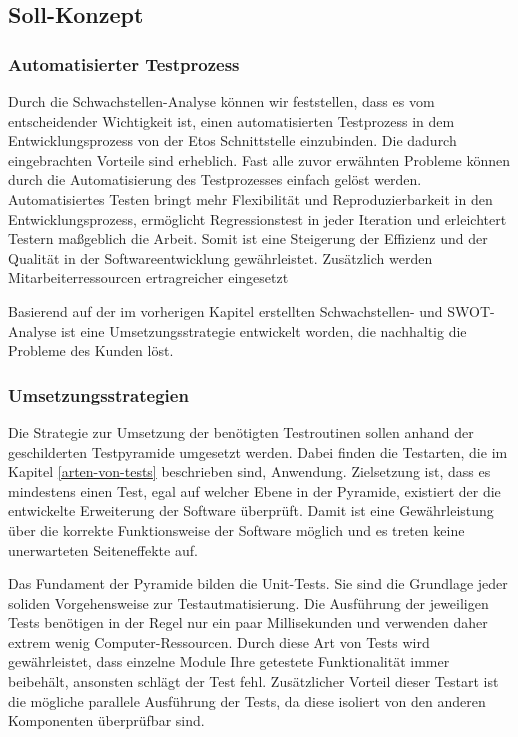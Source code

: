 \subsection{Soll-Konzept}
\subsubsection{Automatisierter Testprozess}
Durch die Schwachstellen-Analyse können wir feststellen, dass es vom entscheidender Wichtigkeit ist, einen automatisierten Testprozess in dem Entwicklungsprozess von der Etos Schnittstelle einzubinden. Die dadurch eingebrachten Vorteile sind erheblich. Fast alle zuvor erwähnten Probleme können durch die Automatisierung des Testprozesses einfach gelöst werden. Automatisiertes Testen bringt mehr Flexibilität und Reproduzierbarkeit in den Entwicklungsprozess, ermöglicht Regressionstest in jeder Iteration und erleichtert Testern maßgeblich die Arbeit. Somit ist eine Steigerung der Effizienz und der Qualität in der Softwareentwicklung gewährleistet. Zusätzlich werden Mitarbeiterressourcen ertragreicher eingesetzt

Basierend auf der im vorherigen Kapitel erstellten Schwachstellen- und SWOT-Analyse ist eine Umsetzungsstrategie entwickelt worden, die nachhaltig die Probleme des Kunden löst.

\subsubsection{Umsetzungsstrategien}
Die Strategie zur Umsetzung der benötigten Testroutinen sollen anhand der geschilderten Testpyramide umgesetzt werden. Dabei finden die Testarten, die im Kapitel \ref{arten-von-tests} beschrieben sind, Anwendung. Zielsetzung ist, dass es mindestens einen Test, egal auf welcher Ebene in der Pyramide, existiert der die entwickelte Erweiterung der Software überprüft. Damit ist eine Gewährleistung über die korrekte Funktionsweise der Software möglich und es treten keine unerwarteten Seiteneffekte auf.

Das Fundament der Pyramide bilden die Unit-Tests. Sie sind die Grundlage jeder soliden Vorgehensweise zur Testautmatisierung. Die Ausführung der jeweiligen Tests benötigen in der Regel nur ein paar Millisekunden und verwenden daher extrem wenig Computer-Ressourcen. Durch diese Art von Tests wird gewährleistet, dass einzelne Module Ihre getestete Funktionalität immer beibehält, ansonsten schlägt der Test fehl. Zusätzlicher Vorteil dieser Testart ist die mögliche parallele Ausführung der Tests, da diese isoliert von den anderen Komponenten überprüfbar sind.


